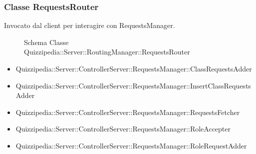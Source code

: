 \subsubsection{Classe RequestsRouter}
Invocato dal client per interagire con RequestsManager.
\begin{figure}[H]
\centering
\noindent{}
\caption{Schema Classe Quizzipedia::Server::RoutingManager::RequestsRouter}
\end{figure}
\begin{itemize}
\item Quizzipedia::Server::ControllerServer::RequestsManager::ClassRequestsAdder
\item Quizzipedia::Server::ControllerServer::RequestsManager::InsertClassRequestsAdder
\item Quizzipedia::Server::ControllerServer::RequestsManager::RequestsFetcher
\item Quizzipedia::Server::ControllerServer::RequestsManager::RoleAccepter
\item Quizzipedia::Server::ControllerServer::RequestsManager::RoleRequestAdder
\end{itemize}
